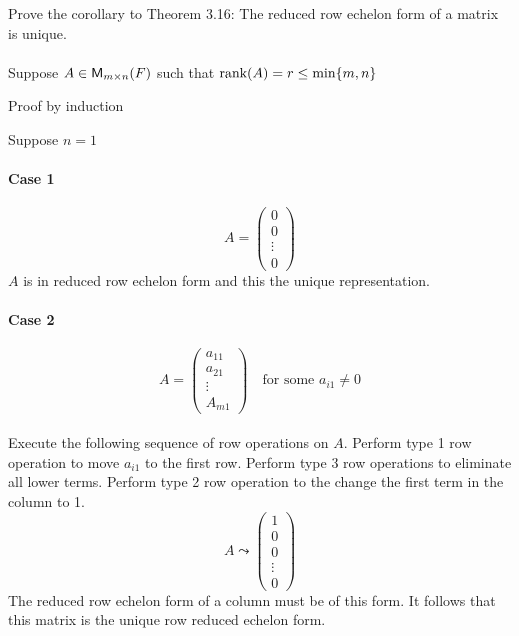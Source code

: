 Prove the corollary to Theorem 3.16: The reduced row echelon form of a
matrix is unique. 
\paragraph{} Suppose $A \in \mathsf{M}_{m \times n}(F)$ such that $\text{rank}({A}) = r
\leq\text{min}\{m,n\}$

Proof by induction 

Suppose $n=1$ 
\paragraph{Case 1}
\begin{equation}
A = \begin{pmatrix} 0 \\ 0 \\ \vdots \\ 0\end{pmatrix}
\end{equation}
$A$ is in reduced row echelon form and this the unique representation.
\paragraph{Case 2}
\begin{equation}
A = \begin{pmatrix}a_{11}\\a_{21}\\\vdots\\A_{m1}\end{pmatrix} \quad
\text{for some } a_{i1} \neq 0
\end{equation}
\paragraph{} Execute the following sequence of row operations on
$A$. Perform type 1 row operation to move $a_{i1}$ to the first
row. Perform type 3 row operations to eliminate all lower
terms. Perform type 2 row operation to the change the first term in
the column to 1.
\begin{equation}
A \leadsto \begin{pmatrix}1\\0\\0\\\vdots\\0\end{pmatrix}
\end{equation}
The reduced row echelon form of a column must be of this form. It
follows that this matrix is the unique row reduced echelon form.

